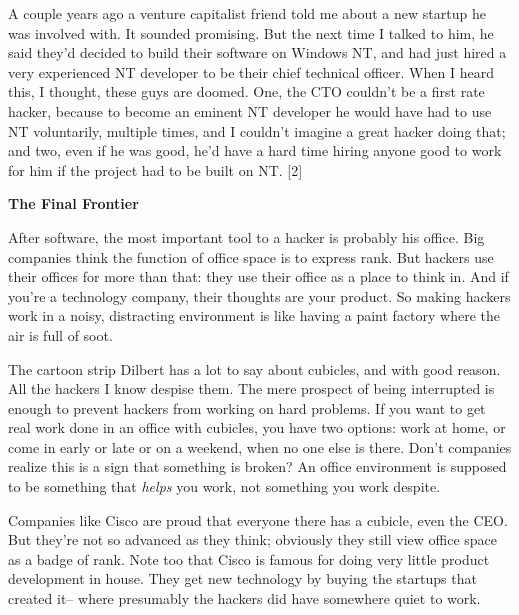 A
                    couple years ago a venture capitalist friend told me about a
                    new startup he was involved with. It sounded promising. But
                    the next time I talked to him, he said they'd decided to
                    build their software on Windows NT, and had just hired a
                    very experienced NT developer to be their chief technical
                    officer. When I heard this, I thought, these guys are
                    doomed. One, the CTO couldn't be a first rate hacker,
                    because to become an eminent NT developer he would have had
                    to use NT voluntarily, multiple times, and I couldn't
                    imagine a great hacker doing that; and two, even if he was
                    good, he'd have a hard time hiring anyone good to work for
                    him if the project had to be built on NT. [2]

\textbf{The Final Frontier}

After software, the most important tool to a
                    hacker is probably his office. Big companies think the
                    function of office space is to express rank. But hackers use
                    their offices for more than that: they use their office as a
                    place to think in. And if you're a technology company, their
                    thoughts are your product. So making hackers work in a
                    noisy, distracting environment is like having a paint
                    factory where the air is full of soot.

The
                    cartoon strip Dilbert has a lot to say about cubicles, and
                    with good reason. All the hackers I know despise them. The
                    mere prospect of being interrupted is enough to prevent
                    hackers from working on hard problems. If you want to get
                    real work done in an office with cubicles, you have two
                    options: work at home, or come in early or late or on a
                    weekend, when no one else is there. Don't companies realize
                    this is a sign that something is broken? An office
                    environment is supposed to be something that
                    \emph{helps} you work, not something you work despite.

Companies
                    like Cisco are proud that everyone there has a cubicle, even
                    the CEO. But they're not so advanced as they think;
                    obviously they still view office space as a badge of rank.
                    Note too that Cisco is famous for doing very little product
                    development in house. They get new technology by buying the
                    startups that created it-- where presumably the hackers did
                    have somewhere quiet to work.

